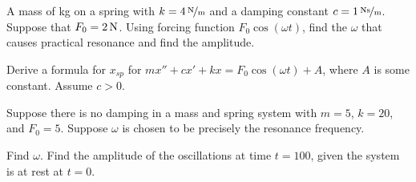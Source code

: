 \setcounter{exercise}{100}

\begin{exercise}
A mass of \unit[4]{kg} on a spring with $k=\unitfrac[4]{N}{m}$ and a damping
constant $c=\unitfrac[1]{Ns}{m}$.
Suppose that $F_0 = \unit[2]{N}$.  Using forcing function $F_0 \cos (\omega t)$,
find the $\omega$ that causes practical resonance and find the amplitude.
\end{exercise}

\begin{exercise}
Derive a formula for $x_{sp}$ for
$mx''+cx'+kx = F_0 \cos(\omega t) + A$,
where $A$ is some constant.  Assume $c > 0$.
\end{exercise}

\begin{exercise}
Suppose there is no damping in a mass and spring system with
$m = 5$, $k= 20$, and $F_0 = 5$.  Suppose $\omega$ is chosen
to be precisely the resonance frequency.
\begin{tasks}
\task
Find $\omega$.
\task
Find the amplitude of the oscillations at time $t=100$, given the system is at
rest at $t=0$.
\end{tasks}
\end{exercise}
